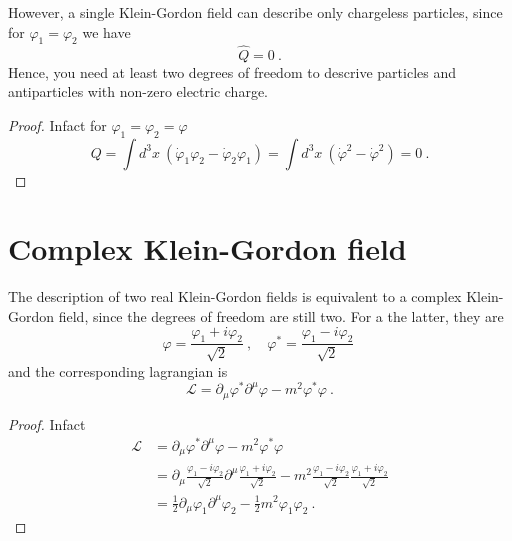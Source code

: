    However, a single Klein-Gordon field can describe only chargeless particles, since for $\varphi_1 = \varphi_2$ we have 
    \begin{equation*}
        \hat Q = 0 ~.
    \end{equation*}
    Hence, you need at least two degrees of freedom to descrive particles and antiparticles with non-zero electric charge.
    \begin{proof}
        Infact for $\varphi_1 = \varphi_2 = \varphi$
        \begin{equation*}
            Q = \int d^3 x ~ (\dot \varphi_1 \varphi_2 - \dot \varphi_2 \varphi_1) = \int d^3 x ~ (\dot \varphi^2 - \dot \varphi^2) = 0 ~.
        \end{equation*}
    \end{proof}

\section{Complex Klein-Gordon field}

    The description of two real Klein-Gordon fields is equivalent to a complex Klein-Gordon field, since the degrees of freedom are still two. For a the latter, they are 
    \begin{equation*}
        \varphi = \frac{\varphi_1 + i \varphi_2}{\sqrt{2}} ~, \quad \varphi^* = \frac{\varphi_1 - i \varphi_2}{\sqrt{2}} ~
    \end{equation*}
    and the corresponding lagrangian is 
    \begin{equation*}
        \mathcal L = \partial_\mu \varphi^* \partial^\mu \varphi - m^2 \varphi^* \varphi ~.
    \end{equation*}
    \begin{proof}
        Infact 
        \begin{equation*}
        \begin{aligned}
            \mathcal L & = \partial_\mu \varphi^* \partial^\mu \varphi - m^2 \varphi^* \varphi \\ & = \partial_\mu \frac{\varphi_1 - i \varphi_2}{\sqrt{2}} \partial^\mu \frac{\varphi_1 + i \varphi_2}{\sqrt{2}} - m^2 \frac{\varphi_1 - i \varphi_2}{\sqrt{2}} \frac{\varphi_1 + i \varphi_2}{\sqrt{2}} \\ & = \frac{1}{2} \partial_\mu \varphi_1 \partial^\mu \varphi_2 - \frac{1}{2} m^2 \varphi_1 \varphi_2 ~.
        \end{aligned}
        \end{equation*}
    \end{proof}

